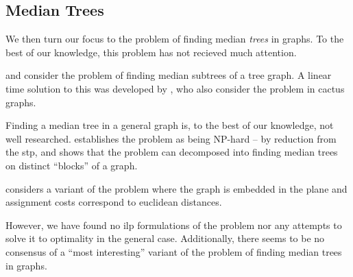  \subsection{Median Trees}
 We then turn our focus to the problem of finding median \textit{trees} in graphs.
  To the best of our knowledge, this problem has not recieved much attention.

  \citet{minieka1985optimal} and \citet{george2003bi} consider the problem of finding
  median subtrees of a tree graph.
  A linear time solution to this was developed by
  \citet{kim1991locating}, who also consider the problem in cactus graphs.

  Finding a median tree in a general graph is, to the best of our knowledge, not well researched.
 \citet{aneja1992location} establishes the
  problem as being NP-hard -- by reduction from the \gls{stp}, and shows that the problem can
  decomposed into finding median trees on distinct ``blocks'' of a graph.

  \citet{kim1991locating} considers a variant of the problem where the graph is embedded in the plane
  and assignment costs correspond to euclidean distances.
  
  However, we have found no \gls{ilp} formulations of the problem nor any attempts to solve it to optimality
  in the general case. Additionally, there seems to be no consensus of a ``most interesting'' variant
  of the problem of finding median trees in graphs.

  


